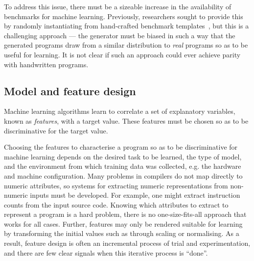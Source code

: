 To address this issue, there must be a sizeable increase in the availability of benchmarks for machine learning. Previously, researchers sought to provide this by randomly instantiating from hand-crafted benchmark templates~\cite{Chiu2015}, but this is a challenging approach --- the generator must be biased in such a way that the generated programs draw from a similar distribution to \emph{real} programs so as to be useful for learning. It is not clear if such an approach could ever achieve parity with handwritten programs.

\subsection{Model and feature design}
\label{subsec:challenge-features}

Machine learning algorithms learn to correlate a set of explanatory variables, known as \emph{features}, with a target value. These features must be chosen so as to be discriminative for the target value.

Choosing the features to characterise a program so as to be discriminative for machine learning  depends on the desired task to be learned, the type of model, and the environment from which training data was collected, e.g. the hardware and machine configuration. Many problems in compilers do not map directly to numeric attributes, so systems for extracting numeric representations from non-numeric inputs must be developed. For example, one might extract instruction counts from the input source code. Knowing which attributes to extract to represent a program is a hard problem, there is no one-size-fits-all approach that works for all cases. Further, features may only be rendered suitable for learning by transforming the initial values such as through scaling or normalising. As a result, feature design is often an incremental process of trial and experimentation, and there are few clear signals when this iterative process is ``done''.


